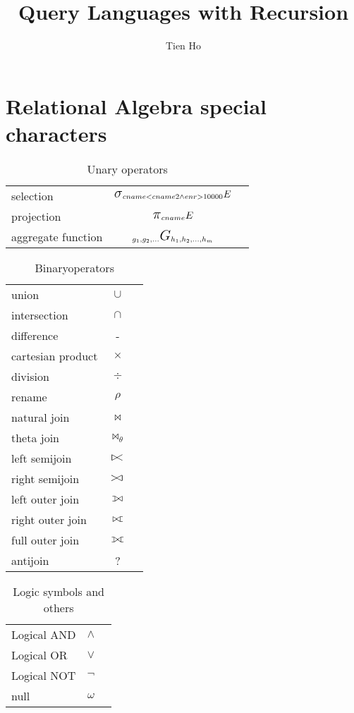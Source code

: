 \documentclass[11pt]{article}
\def\ojoin{\setbox0=\hbox{$\bowtie$}%
  \rule[-.02ex]{.25em}{.4pt}\llap{\rule[\ht0]{.25em}{.4pt}}}
\def\leftouterjoin{\mathbin{\ojoin\mkern-5.8mu\bowtie}}
\def\rightouterjoin{\mathbin{\bowtie\mkern-5.8mu\ojoin}}
\def\fullouterjoin{\mathbin{\ojoin\mkern-5.8mu\bowtie\mkern-5.8mu\ojoin}}
\newcommand{\select}{\mbox{\Large$\sigma$}}
\newcommand{\cross}{\mbox{$\times$}}
\newcommand{\intersection}{\mbox{$\cap$}}
\newcommand{\union}{\mbox{$\cup$}}
\newcommand{\leftsemijoin}{\mbox{$\mathrel{\raise1pt\hbox{\vrule height5pt
depth0pt width0.6pt\hskip-1.5pt$>$\hskip -2.5pt$<$}}$}}
\newcommand{\rightsemijoin}{\mbox{$\mathrel{\raise1pt\hbox{\hskip-1.5pt$>$\hskip -2.5pt$<$\hskip -1.1pt\vrule height5pt
depth0pt width0.6pt}}$}}
\newcommand{\project}{\mbox{\Large$\pi$}}
\newcommand{\aggregatefn}{\mbox{\Large$G$}}
\begin{document}
\title{Query Languages with Recursion}
\author{Tien Ho}
\maketitle

\begin{center}
\end{center}

\section{Relational Algebra special characters}
\begin{table}[!th]
\begin{tabular}{|l|c|r|}
\hline
selection &  $\select_{cname<cname2 \wedge enr>10000} E$ \\
projection &  $\project_{cname} E$ \\
aggregate function &  $_{g_1,g_2,...} \aggregatefn_{h_1,h_2,...,h_m}$ \\
\hline
\end{tabular}
\caption{Unary operators}
\end{table}

\begin{table}[!th]
\begin{tabular}{|l|c|r|}
\hline
union & 			\union \\
intersection & 		\intersection \\
difference & 		- \\
cartesian product & \cross \\
division & 			$\div$ \\
rename & 			$\rho$ \\
natural join & 		$\bowtie$ \\
theta join & 		$\bowtie_{\theta}$ \\
left semijoin & 	$\leftsemijoin$ \\
right semijoin & 	$\rightsemijoin$ \\ 
left outer join & 	$\leftouterjoin$ \\
right outer join & 	$\rightouterjoin$ \\
full outer join & 	$\fullouterjoin$ \\
antijoin & 			? \\
\hline
\end{tabular}
\caption{Binaryoperators}
\end{table}

\begin{table}[!th]
\begin{tabular}{|l|c|r|}
\hline
Logical AND & 	$\wedge$ \\
Logical OR & 	$\vee$ \\
Logical NOT & 	$\neg$ \\
null & 			$\omega$ \\
\hline
\end{tabular}
\caption{Logic symbols and others}
\end{table}
\end{document}

